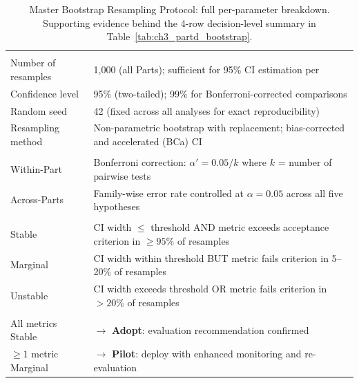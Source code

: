 {
\begin{xltabular}{\textwidth}{@{} >{\raggedright\arraybackslash}p{3.0cm} L @{}}
\caption[Master Bootstrap Resampling Protocol: Full Per-Parameter Breakdown]{Master Bootstrap Resampling Protocol: full per-parameter breakdown. Supporting evidence behind the 4-row decision-level summary in Table~\ref{tab:ch3_partd_bootstrap}.}\label{tab:appc_partd_bootstrap_full} \\
\toprule
{} &  \\
\midrule
\endfirsthead
\endhead
\bottomrule
\endlastfoot
{} \\
\addlinespace
Number of resamples & 1,000 (all Parts); sufficient for 95\% CI estimation per \cite{efron1993bootstrap} \\
Confidence level & 95\% (two-tailed); 99\% for Bonferroni-corrected comparisons \\
Random seed & 42 (fixed across all analyses for exact reproducibility) \\
Resampling method & Non-parametric bootstrap with replacement; bias-corrected and accelerated (BCa) CI \\
\midrule
{} \\
\addlinespace
Within-Part & Bonferroni correction: $\alpha' = 0.05 / k$ where $k$ = number of pairwise tests \\
Across-Parts & Family-wise error rate controlled at $\alpha = 0.05$ across all five hypotheses \\
\midrule
{} \\
\addlinespace
Stable & CI width $\leq$ threshold AND metric exceeds acceptance criterion in $\geq 95\%$ of resamples \\
Marginal & CI width within threshold BUT metric fails criterion in 5--20\% of resamples \\
Unstable & CI width exceeds threshold OR metric fails criterion in $> 20\%$ of resamples \\
\midrule
{} \\
\addlinespace
All metrics Stable & $\to$ \textbf{Adopt}: evaluation recommendation confirmed \\
$\geq 1$ metric Marginal & $\to$ \textbf{Pilot}: deploy with enhanced monitoring and re-evaluation \\

\end{xltabular}}
